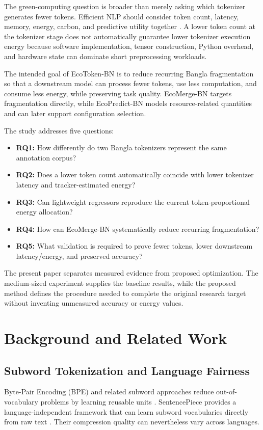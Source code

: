 \documentclass[conference]{IEEEtran}
\begin{document}
The green-computing question is broader than merely asking which tokenizer generates fewer tokens. Efficient NLP should consider token count, latency, memory, energy, carbon, and predictive utility together \cite{schwartz2020,henderson2020,strubell2019}. A lower token count at the tokenizer stage does not automatically guarantee lower tokenizer execution energy because software implementation, tensor construction, Python overhead, and hardware state can dominate short preprocessing workloads.

The intended goal of EcoToken-BN is to reduce recurring Bangla fragmentation so that a downstream model can process fewer tokens, use less computation, and consume less energy, while preserving task quality. EcoMerge-BN targets fragmentation directly, while EcoPredict-BN models resource-related quantities and can later support configuration selection.

The study addresses five questions:
\begin{itemize}
\item \textbf{RQ1:} How differently do two Bangla tokenizers represent the same annotation corpus?
\item \textbf{RQ2:} Does a lower token count automatically coincide with lower tokenizer latency and tracker-estimated energy?
\item \textbf{RQ3:} Can lightweight regressors reproduce the current token-proportional energy allocation?
\item \textbf{RQ4:} How can EcoMerge-BN systematically reduce recurring fragmentation?
\item \textbf{RQ5:} What validation is required to prove fewer tokens, lower downstream latency/energy, and preserved accuracy?
\end{itemize}

The present paper separates measured evidence from proposed optimization. The medium-sized experiment supplies the baseline results, while the proposed method defines the procedure needed to complete the original research target without inventing unmeasured accuracy or energy values.

\section{Background and Related Work}
\subsection{Subword Tokenization and Language Fairness}
Byte-Pair Encoding (BPE) and related subword approaches reduce out-of-vocabulary problems by learning reusable units \cite{sennrich2016}. SentencePiece provides a language-independent framework that can learn subword vocabularies directly from raw text \cite{kudo2018}. Their compression quality can nevertheless vary across languages.
\end{document}
